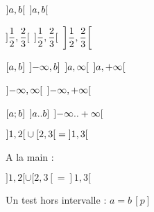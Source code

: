 \documentclass[varwidth, border = 3pt]{standalone}
\begin{document}
$\intervalO{a, b}$
\quad
$\intervalO[big]{a, b}$

$\intervalO{\dfrac{1}{2}, \dfrac{2}{3}}$
\quad
$\intervalO[Big]{\dfrac{1}{2}, \dfrac{2}{3}}$
\quad
$\intervalO*{\dfrac{1}{2}, \dfrac{2}{3}}$

$\intervalC{a, b}$
\quad
$\intervalOC{-\infty, b}$
\quad
$\intervalO{a, \infty}$
\quad
$\intervalO{a, +\infty}$

$\intervalO{-\infty, \infty}$
\quad
$\intervalO{-\infty, +\infty}$

$\intervalC{a ; b}$
\quad
$\intervalOC{a .. b}$
\quad
$\intervalO{-\infty .. +\infty}$

$\intervalO{1, 2} \cup \intervalCO{2, 3} = \intervalO{1, 3}$

A la main : 

$]1, 2[ \cup [2, 3[ = ]1, 3[$

Un test hors intervalle : $a = b \, [p]$
\end{document}
